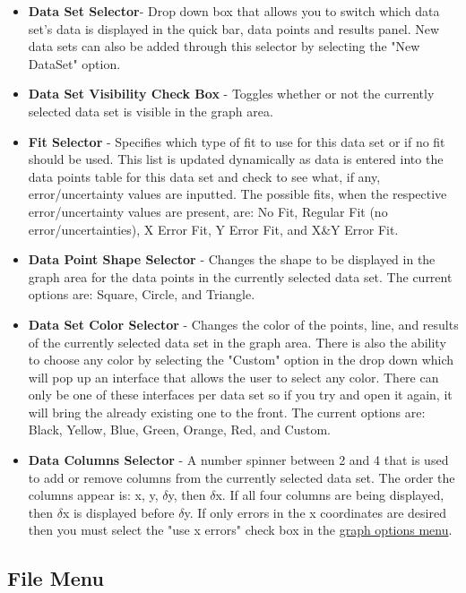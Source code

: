 \documentclass[titlepage,12pt]{article}
\begin{document}
\begin{itemize}
\item \textbf{Data Set Selector}- Drop down box that allows you to switch which data set's data is displayed in the quick bar, data points and results panel. New data sets can also be added through this selector by selecting the "New DataSet" option.
\item \textbf{Data Set Visibility Check Box} - Toggles whether or not the currently selected data set is visible in the graph area.
\item \textbf{Fit Selector} - Specifies which type of fit to use for this data set or if no fit should be used. This list is updated dynamically as data is entered into the data points table for this data set and check to see what, if any, error/uncertainty values are inputted. The possible fits, when the respective error/uncertainty values are present, are: No Fit, Regular Fit (no error/uncertainties), X Error Fit, Y Error Fit, and X\&Y Error Fit.
\item \textbf{Data Point Shape Selector} - Changes the shape to be displayed in the graph area for the data points in the currently selected data set. The current options are: Square, Circle, and Triangle.
\item \textbf{Data Set Color Selector} - Changes the color of the points, line, and results of the currently selected data set in the graph area. There is also the ability to choose any color by selecting the "Custom" option in the drop down which will pop up an interface that allows the user to select any color. There can only be one of these interfaces per data set so if you try and open it again, it will bring the already existing one to the front. The current options are: Black, Yellow, Blue, Green, Orange, Red, and Custom.
\item \textbf{Data Columns Selector} - A number spinner between 2 and 4 that is used to add or remove columns from the currently selected data set. The order the columns appear is: x, y, $\delta$y, then $\delta$x. If all four columns are being displayed, then $\delta$x is displayed before $\delta$y. If only errors in the x coordinates are desired then you must select the "use x errors" check box in the \hyperref[sec:options]{graph options menu}.
\end{itemize}



\subsection{File Menu}
\end{document}
